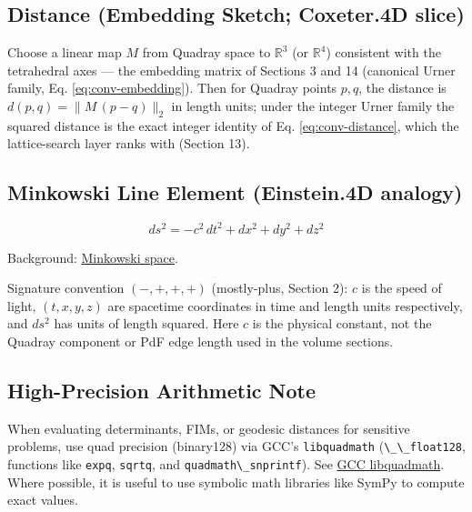 \documentclass[
  10pt,
]{article}
\newcommand{\passthrough}[1]{#1}
\begin{document}
\subsection{Distance (Embedding Sketch; Coxeter.4D
slice)}\label{distance-embedding-sketch-coxeter.4d-slice}

Choose a linear map \(M\) from Quadray space to \(\mathbb{R}^3\) (or
\(\mathbb{R}^4\)) consistent with the tetrahedral axes --- the embedding
matrix of Sections 3 and 14 (canonical Urner family, Eq.
\eqref{eq:conv-embedding}). Then for Quadray points \(p, q\), the
distance is \(d(p, q) = \lVert M\,(p - q) \rVert_2\) in length units;
under the integer Urner family the squared distance is the exact integer
identity of Eq. \eqref{eq:conv-distance}, which the lattice-search layer
ranks with (Section 13).

\subsection{Minkowski Line Element (Einstein.4D
analogy)}\label{minkowski-line-element-einstein.4d-analogy}

\begin{equation}\label{eq:minkowski_line_element}
ds^2 = -c^2\,dt^2 + dx^2 + dy^2 + dz^2
\end{equation}

Background:
\href{https://en.wikipedia.org/wiki/Minkowski_space}{Minkowski space}.

Signature convention \((-,+,+,+)\) (mostly-plus, Section 2): \(c\) is
the speed of light, \((t, x, y, z)\) are spacetime coordinates in time
and length units respectively, and \(ds^2\) has units of length squared.
Here \(c\) is the physical constant, not the Quadray component or PdF
edge length used in the volume sections.

\subsection{High-Precision Arithmetic
Note}\label{high-precision-arithmetic-note}

When evaluating determinants, FIMs, or geodesic distances for sensitive
problems, use quad precision (binary128) via GCC's
\passthrough{\lstinline!libquadmath!}
(\passthrough{\lstinline!\_\_float128!}, functions like
\passthrough{\lstinline!expq!}, \passthrough{\lstinline!sqrtq!}, and
\passthrough{\lstinline!quadmath\_snprintf!}). See
\href{https://gcc.gnu.org/onlinedocs/libquadmath/index.html}{GCC
libquadmath}. Where possible, it is useful to use symbolic math
libraries like SymPy to compute exact values.
\end{document}
